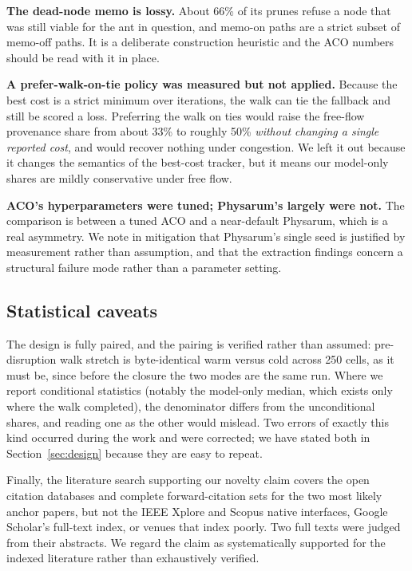 \textbf{The dead-node memo is lossy.} About 66\% of its prunes refuse a node
that was still viable for the ant in question, and memo-on paths are a strict
subset of memo-off paths. It is a deliberate construction heuristic and the
ACO numbers should be read with it in place.

\textbf{A prefer-walk-on-tie policy was measured but not applied.} Because
the best cost is a strict minimum over iterations, the walk can tie the
fallback and still be scored a loss. Preferring the walk on ties would raise
the free-flow provenance share from about 33\% to roughly 50\% \emph{without
changing a single reported cost}, and would recover nothing under
congestion. We left it out because it changes the semantics of the best-cost
tracker, but it means our model-only shares are mildly conservative under
free flow.

\textbf{ACO's hyperparameters were tuned; Physarum's largely were not.} The
comparison is between a tuned ACO and a near-default Physarum, which is a
real asymmetry. We note in mitigation that Physarum's single seed is
justified by measurement rather than assumption, and that the extraction
findings concern a structural failure mode rather than a parameter setting.

\subsection{Statistical caveats}

The design is fully paired, and the pairing is verified rather than assumed:
pre-disruption walk stretch is byte-identical warm versus cold across 250
cells, as it must be, since before the closure the two modes are the same
run. Where we report conditional statistics (notably the model-only median, which
exists only where the walk completed), the denominator differs from the unconditional shares, and reading one as the other would
mislead. Two errors of exactly this kind occurred during the work and were
corrected; we have stated both in Section~\ref{sec:design} because they are
easy to repeat.

Finally, the literature search supporting our novelty claim covers the open
citation databases and complete forward-citation sets for the two most likely
anchor papers, but not the IEEE Xplore and Scopus native interfaces, Google
Scholar's full-text index, or venues that index poorly. Two full texts were
judged from their abstracts. We regard the claim as systematically supported
for the indexed literature rather than exhaustively verified.
